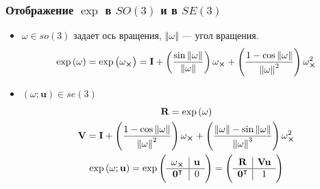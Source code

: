 \documentclass[notheorems,aspectratio=169]{beamer}
\begin{document}
\begin{frame}
  \frametitle{Отображение $\exp$ в $SO(3)$ и в $SE(3)$}
  \begin{itemize}
    \item $\omega\in so(3)$ задает ось вращения, $\left\Vert\omega\right\Vert$ --- угол вращения.
    \begin{equation*}
      \exp\left(\omega\right)=\exp\left(\omega_{\cross}\right)=\mathbf{I}+\left(\frac{\sin\left\Vert\omega\right\Vert}{\left\Vert\omega\right\Vert}\right)\omega_{\cross}+\left(\frac{1-\cos\left\Vert\omega\right\Vert}{\left\Vert\omega\right\Vert^2}\right)\omega_{\cross}^2
    \end{equation*}

  \item $\left(\omega; \mathbf{u}\right)\in se(3)$
    \begin{equation*}
    \begin{gathered}
      \mathbf{R}=\exp\left(\omega\right) \\
      \mathbf{V}=\mathbf{I}+\left(\frac{1-\cos\left\Vert\omega\right\Vert}{\left\Vert\omega\right\Vert^2}\right)\omega_{\cross}+\left(\frac{\left\Vert\omega\right\Vert-\sin\left\Vert\omega\right\Vert}{\left\Vert\omega\right\Vert^3}\right)\omega_{\cross}^2 \\
      \exp\left(\omega; \mathbf{u}\right)=\exp
      \begin{pmatrix}
        \begin{array}{c|c}
          \omega_{\cross} & \mathbf{u} \\
          \hline
          \mathbf{0}^\intercal & 0
        \end{array}
      \end{pmatrix} =
      \begin{pmatrix}
        \begin{array}{c|c}
          \mathbf{R} & \mathbf{V}\mathbf{u} \\
          \hline
          \mathbf{0}^\intercal & 1
        \end{array}
      \end{pmatrix}
    \end{gathered}
    \end{equation*}
  \end{itemize}
\end{frame}
\end{document}
